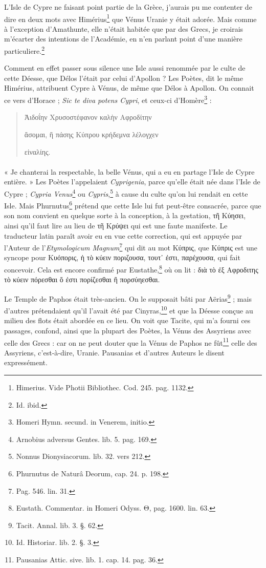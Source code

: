 \documentclass[a4paper, 11pt, oneside, polutonikogreek, french]{article}
\begin{document}
L'Isle de Cypre ne faisant point partie de la Grèce, j'aurais pu me contenter de dire en deux mots avec Himérius\footnote{Himerius. Vide Photii Bibliothec. Cod. 245. pag. 1132.} que Vénus Uranie y était adorée. Mais comme à l'exception d'Amathunte, elle n'était habitée que par des Grecs, je croirais m'écarter des intentions de l'Académie, en n'en parlant point d'une manière particuliere.\footnote{Id. ibid.}

Comment en effet passer sous silence une Isle aussi renommée par le culte de cette Déesse, que Délos l'était par celui d'Apollon ? Les Poètes, dit le même Himérius, attribuent Cypre à Vénus, de même que Délos à Apollon. On connait ce vers d'Horace ; \emph{Sic te diva potens Cypri}, et ceux-ci d'Homère\footnote{Homeri Hymn. secund. in Venerem, initio.} :
\begin{quotation}
Ἀιδοΐην Χρυσοστέφανον καλὴν Αφροδίτην

ἄσομαι, ἣ πάσης Κύπρου κρήδεμνα λέλογχεν

εἰναλίης.
\end{quotation}
\paragraph{}
« Je chanterai la respectable, la belle Vénus, qui a eu en partage l'Isle de Cypre entière. » Les Poètes l'appelaient \emph{Cyprigenia}, parce qu'elle était née dans l'Isle de Cypre ; \emph{Cypria Venus}\footnote{Arnobius adversus Gentes. lib. 5. pag. 169.} ou \emph{Cypris},\footnote{Nonnus Dionysiacorum. lib. 32. vers 212.} à cause du culte qu'on lui rendait en cette Isle. Mais Phurnutus\footnote{Phurnutus de Naturâ Deorum, cap. 24. p. 198.} prétend que cette Isle lui fut peut-être consacrée, parce que son nom convient en quelque sorte à la conception, à la gestation, τῆ Κύησει, ainsi qu'il faut lire au lieu de τῆ Κρύψει qui est une faute manifeste. Le traducteur latin paraît avoir eu en vue cette correction, qui est appuyée par l'Auteur de l'\emph{Etymologicum Magnum}\footnote{Pag. 546. lin. 31.} qui dit au mot Κύπρις, que Κύπρις est une syncope pour Κυόπορις, ἡ τὸ κύειν ποριζουσα, τουτ᾿ ἐστι, παρέχουσα, qui fait concevoir. Cela est encore confirmé par Eustathe,\footnote{Eustath. Commentar. in Homeri Odyss. Θ, pag. 1600. lin. 63.} où on lit : διὰ τὸ ἐξ Αφροδιτης τὸ κύειν πόρεσθαι ὅ ἐστι πορίζεσθαι ἢ πορσύηεσθαι.

Le Temple de Paphos était très-ancien. On le supposait bâti par Aërias\footnote{Tacit. Annal. lib. 3. §. 62.} ; mais d'autres prétendaient qu'il l'avait été par Cinyras,\footnote{Id. Historiar. lib. 2. §. 3.} et que la Déesse conçue au milieu des flots était abordée en ce lieu. On voit que Tacite, qui m'a fourni ces passages, confond, ainsi que la plupart des Poètes, la Vénus des Assyriens avec celle des Grecs : car on ne peut douter que la Vénus de Paphos ne fût\footnote{Pausanias Attic. sive. lib. 1. cap. 14. pag. 36.} celle des Assyriens, c'est-à-dire, Uranie. Pausanias et d'autres Auteurs le disent expressément.
\end{document}
